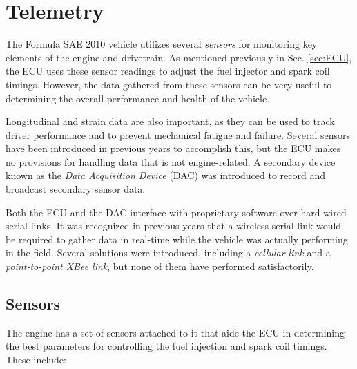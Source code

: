 \section{Telemetry}

The Formula SAE 2010 vehicle utilizes several \emph{sensors} for monitoring key elements of the engine and drivetrain. As mentioned previously in Sec. \ref{sec:ECU}, the ECU uses these sensor readings to adjust the fuel injector and spark coil timings. However, the data gathered from these sensors can be very useful to determining the overall performance and health of the vehicle. 

Longitudinal and strain data are also important, as they can be used to track driver performance and to prevent mechanical fatigue and failure. Several sensors have been introduced in previous years to accomplish this, but the ECU makes no provisions for handling data that is not engine-related. A secondary device known as the \emph{Data Acquisition Device} (DAC) was introduced to record and broadcast secondary sensor data.

Both the ECU and the DAC interface with proprietary software over hard-wired serial links. It was recognized in previous years that a wireless serial link would be required to gather data in real-time while the vehicle was actually performing in the field. Several solutions were introduced, including a \emph{cellular link} and a \emph{point-to-point XBee link}, but none of them have performed satisfactorily.

\subsection{Sensors}

The engine has a set of sensors attached to it that aide the ECU in determining the best parameters for controlling the fuel injection and spark coil timings. These include:

